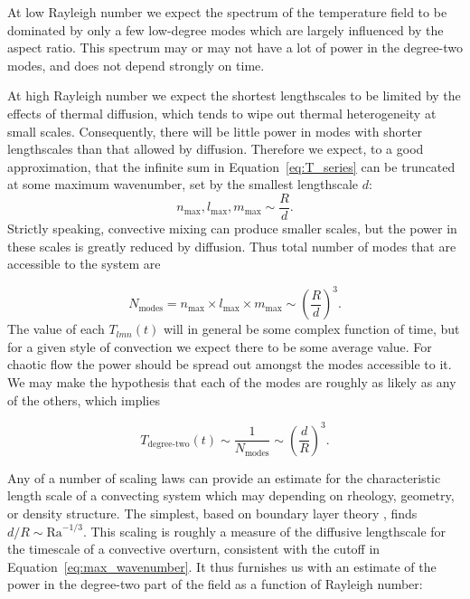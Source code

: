 \documentclass[extra,mreferee]{gji}
\begin{document}
At low Rayleigh number we expect the spectrum of the temperature field to be dominated by only a few low-degree modes which are largely influenced by the aspect ratio.
This spectrum may or may not have a lot of power in the degree-two modes, and does not depend strongly on time.

At high Rayleigh number we expect the shortest lengthscales to be limited by the effects of thermal diffusion,
which tends to wipe out thermal heterogeneity at small scales.  Consequently, there will be little power in modes
with shorter lengthscales than that allowed by diffusion. 
Therefore we expect, to a good approximation, that the infinite sum in Equation~\eqref{eq:T_series} can be truncated at some maximum wavenumber, set by the smallest lengthscale $d$:
\begin{equation}
n_{\text{max}}, l_{\text{max}}, m_{\text{max}} \sim \frac{R}{d}.
\label{eq:max_wavenumber}
\end{equation}
Strictly speaking, convective mixing can produce smaller scales, but the power in these scales
is greatly reduced by diffusion.
Thus total number of modes that are accessible to the system are 

\begin{equation}
N_{\text{modes}} = n_{\text{max}} \times l_{\text{max}} \times m_{\text{max}} \sim \left( \frac{R}{d} \right)^{3}.
\end{equation}
The value of each $T_{lmn}(t)$ will in general be some complex function of time, but for a given style of convection we expect there to be some average value.
For chaotic flow the power should be spread out amongst the modes accessible to it.
We may make the hypothesis that each of the modes are roughly as likely as any of the others, which implies

\begin{equation}
T_{\text{degree-two}}(t) \sim \frac{1}{N_{\text{modes}}} \sim \left( \frac{d}{R}\right)^3.
\end{equation}

Any of a number of scaling laws can provide an estimate for the characteristic length scale of a convecting system which may depending on rheology, geometry, or density structure.
The simplest, based on boundary layer theory \citep{turcotte1967finite}, finds $d/R \sim \mathrm{Ra}^{-1/3}$.
This scaling is roughly a measure of the diffusive lengthscale for the timescale of a convective overturn, consistent
with the cutoff in Equation~\eqref{eq:max_wavenumber}.
It thus furnishes us with an estimate of the power in 
the degree-two part of the field as a function of Rayleigh number:
\end{document}
